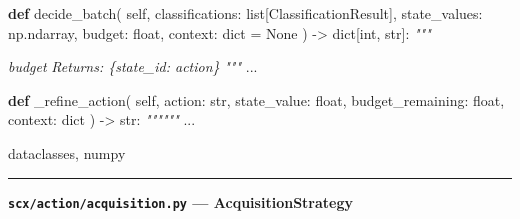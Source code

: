 \documentclass[
  12pt,
]{article}
\newenvironment{Shaded}{}{}
\newcommand{\BuiltInTok}[1]{\textcolor[rgb]{0.00,0.50,0.00}{#1}}
\newcommand{\CommentTok}[1]{\textcolor[rgb]{0.38,0.63,0.69}{\textit{#1}}}
\newcommand{\KeywordTok}[1]{\textcolor[rgb]{0.00,0.44,0.13}{\textbf{#1}}}
\newcommand{\NormalTok}[1]{#1}
\newcommand{\OperatorTok}[1]{\textcolor[rgb]{0.40,0.40,0.40}{#1}}
\newcommand{\VariableTok}[1]{\textcolor[rgb]{0.10,0.09,0.49}{#1}}
\begin{document}
\begin{Shaded}
\begin{Highlighting}[]
    \KeywordTok{def}\NormalTok{ decide\_batch(}
        \VariableTok{self}\NormalTok{,}
\NormalTok{        classifications: }\BuiltInTok{list}\NormalTok{[ClassificationResult],}
\NormalTok{        state\_values: np.ndarray,}
\NormalTok{        budget: }\BuiltInTok{float}\NormalTok{,}
\NormalTok{        context: }\BuiltInTok{dict} \OperatorTok{=} \VariableTok{None}
\NormalTok{    ) }\OperatorTok{{-}\textgreater{}} \BuiltInTok{dict}\NormalTok{[}\BuiltInTok{int}\NormalTok{, }\BuiltInTok{str}\NormalTok{]:}
        \CommentTok{"""}

\CommentTok{         budget }
\CommentTok{        Returns: \{state\_id: action\}}
\CommentTok{        """}
\NormalTok{        ...}

    \KeywordTok{def}\NormalTok{ \_refine\_action(}
        \VariableTok{self}\NormalTok{, action: }\BuiltInTok{str}\NormalTok{,}
\NormalTok{        state\_value: }\BuiltInTok{float}\NormalTok{,}
\NormalTok{        budget\_remaining: }\BuiltInTok{float}\NormalTok{,}
\NormalTok{        context: }\BuiltInTok{dict}
\NormalTok{    ) }\OperatorTok{{-}\textgreater{}} \BuiltInTok{str}\NormalTok{:}
        \CommentTok{""""""}
\NormalTok{        ...}
\end{Highlighting}
\end{Shaded}

dataclasses, numpy

\begin{center}\rule{0.5\linewidth}{0.5pt}\end{center}

\textbf{\texttt{scx/action/acquisition.py} --- AcquisitionStrategy}
\end{document}

